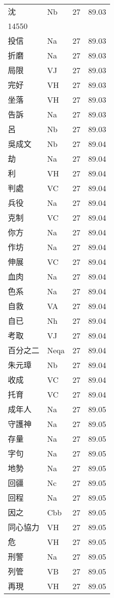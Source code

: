 \documentclass[twocolumn]{book}
\begin{document}
\begin{supertabular}{llrr}
沈 & Nb & 27 &  89.03\\
14550\\
投信 & Na & 27 &  89.03\\
折磨 & Na & 27 &  89.03\\
局限 & VJ & 27 &  89.03\\
完好 & VH & 27 &  89.03\\
坐落 & VH & 27 &  89.03\\
告訴 & Na & 27 &  89.03\\
呂 & Nb & 27 &  89.03\\
吳成文 & Nb & 27 &  89.04\\
劫 & Na & 27 &  89.04\\
利 & VH & 27 &  89.04\\
判處 & VC & 27 &  89.04\\
兵役 & Na & 27 &  89.04\\
克制 & VC & 27 &  89.04\\
你方 & Na & 27 &  89.04\\
作坊 & Na & 27 &  89.04\\
伸展 & VC & 27 &  89.04\\
血肉 & Na & 27 &  89.04\\
色系 & Na & 27 &  89.04\\
自救 & VA & 27 &  89.04\\
自已 & Nh & 27 &  89.04\\
考取 & VJ & 27 &  89.04\\
百分之二 & Neqa & 27 &  89.04\\
朱元璋 & Nb & 27 &  89.04\\
收成 & VC & 27 &  89.04\\
托育 & VC & 27 &  89.04\\
成年人 & Na & 27 &  89.05\\
守護神 & Na & 27 &  89.05\\
存量 & Na & 27 &  89.05\\
字句 & Na & 27 &  89.05\\
地勢 & Na & 27 &  89.05\\
回疆 & Nc & 27 &  89.05\\
回程 & Na & 27 &  89.05\\
因之 & Cbb & 27 &  89.05\\
同心協力 & VH & 27 &  89.05\\
危 & VH & 27 &  89.05\\
刑警 & Na & 27 &  89.05\\
列管 & VB & 27 &  89.05\\
再現 & VH & 27 &  89.05\\

\end{supertabular}
\end{document}
